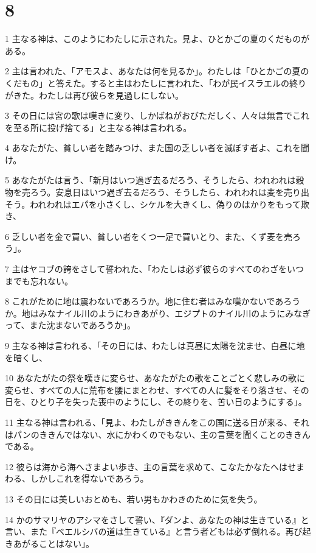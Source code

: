 \chapter{8}

\par 1 主なる神は、このようにわたしに示された。見よ、ひとかごの夏のくだものがある。
\par 2 主は言われた、「アモスよ、あなたは何を見るか」。わたしは「ひとかごの夏のくだもの」と答えた。すると主はわたしに言われた、「わが民イスラエルの終りがきた。わたしは再び彼らを見過しにしない。
\par 3 その日には宮の歌は嘆きに変り、しかばねがおびただしく、人々は無言でこれを至る所に投げ捨てる」と主なる神は言われる。
\par 4 あなたがた、貧しい者を踏みつけ、また国の乏しい者を滅ぼす者よ、これを聞け。
\par 5 あなたがたは言う、「新月はいつ過ぎ去るだろう、そうしたら、われわれは穀物を売ろう。安息日はいつ過ぎ去るだろう、そうしたら、われわれは麦を売り出そう。われわれはエパを小さくし、シケルを大きくし、偽りのはかりをもって欺き、
\par 6 乏しい者を金で買い、貧しい者をくつ一足で買いとり、また、くず麦を売ろう」。
\par 7 主はヤコブの誇をさして誓われた、「わたしは必ず彼らのすべてのわざをいつまでも忘れない。
\par 8 これがために地は震わないであろうか。地に住む者はみな嘆かないであろうか。地はみなナイル川のようにわきあがり、エジプトのナイル川のようにみなぎって、また沈まないであろうか」。
\par 9 主なる神は言われる、「その日には、わたしは真昼に太陽を沈ませ、白昼に地を暗くし、
\par 10 あなたがたの祭を嘆きに変らせ、あなたがたの歌をことごとく悲しみの歌に変らせ、すべての人に荒布を腰にまとわせ、すべての人に髪をそり落させ、その日を、ひとり子を失った喪中のようにし、その終りを、苦い日のようにする」。
\par 11 主なる神は言われる、「見よ、わたしがききんをこの国に送る日が来る、それはパンのききんではない、水にかわくのでもない、主の言葉を聞くことのききんである。
\par 12 彼らは海から海へさまよい歩き、主の言葉を求めて、こなたかなたへはせまわる、しかしこれを得ないであろう。
\par 13 その日には美しいおとめも、若い男もかわきのために気を失う。
\par 14 かのサマリヤのアシマをさして誓い、『ダンよ、あなたの神は生きている』と言い、また『ベエルシバの道は生きている』と言う者どもは必ず倒れる。再び起きあがることはない」。

